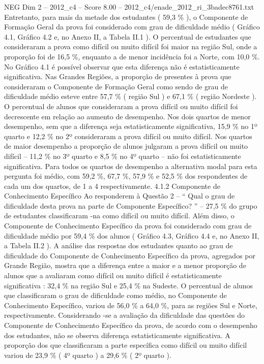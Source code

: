 \begin{textsample}{NEG Dim 2 – 2012\_c4 – Score 8.00 – 2012\_c4/enade\_2012\_ri\_3badec8761.txt}
Entretanto, para mais da metade dos estudantes ( 59,3 \% ), o Componente de Formação Geral da prova foi considerado com grau de dificuldade médio ( Gráfico 4.1, Gráfico 4.2 e, no Anexo II, a Tabela II.1 ).
O percentual de estudantes que consideraram a prova como difícil ou muito difícil foi maior na região Sul, onde a proporção foi de 16,5 \%, enquanto a de menor incidência foi a Norte, com 10,0 \%.
No Gráfico 4.1 é possível observar que esta diferença não é estatisticamente significativa.
Nas Grandes Regiões, a proporção de presentes à prova que consideraram o Componente de Formação Geral como sendo de grau de dificuldade médio esteve entre 57,7 \% ( região Sul ) e 67,1 \% ( região Nordeste ).
O percentual de alunos que consideraram a prova difícil ou muito difícil foi decrescente em relação ao aumento de desempenho.
Nos dois quartos de menor desempenho, sem que a diferença seja estatisticamente significativa, 15,9 \% no 1º quarto e 12,2 \% no 2º consideraram a prova difícil ou muito difícil.
Nos quartos de maior desempenho a proporção de alunos julgaram a prova difícil ou muito difícil – 11,2 \% no 3º quarto e 8,5 \% no 4º quarto – não foi estatisticamente significativa.
Para todos os quartos de desempenho a alternativa modal para esta pergunta foi médio, com 59,2 \%, 67,7 \%, 57,9 \% e 52,5 \% dos respondentes de cada um dos quartos, de 1 a 4 respectivamente. 4.1.2 Componente de Conhecimento Específico Ao responderem à Questão 2 – “ Qual o grau de dificuldade desta prova na parte de Componente Específico? ” – 27,5 \% do grupo de estudantes classificaram -na como difícil ou muito difícil.
Além disso, o Componente de Conhecimento Específico da prova foi considerado com grau de dificuldade médio por 59,4 \% dos alunos ( Gráfico 4.3, Gráfico 4.4 e, no Anexo II, a Tabela II.2 ).
A análise das respostas dos estudantes quanto ao grau de dificuldade do Componente de Conhecimento Específico da prova, agregados por Grande Região, mostra que a diferença entre a maior e a menor proporção de alunos que a avaliaram como difícil ou muito difícil é estatisticamente significativa : 32,4 \% na região Sul e 25,4 \% na Sudeste.
O percentual de alunos que classificaram o grau de dificuldade como médio, no Componente de Conhecimento Específico, variou de 56,0 \% a 64,0 \%, para as regiões Sul e Norte, respectivamente.
Considerando -se a avaliação da dificuldade das questões do Componente de Conhecimento Específico da prova, de acordo com o desempenho dos estudantes, não se observa diferença estatisticamente significativa.
A proporção dos que classificaram a parte específica como difícil ou muito difícil variou de 23,9 \% ( 4º quarto ) a 29,6 \% ( 2º quarto ).

\end{textsample}
